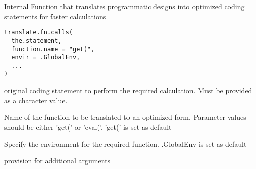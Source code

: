 \documentclass[a4paper]{book}
\begin{document}
%
\begin{Description}\relax
Internal Function that translates programmatic designs into optimized coding statements for faster calculations
\end{Description}
%
\begin{Usage}
\begin{verbatim}
translate.fn.calls(
  the.statement,
  function.name = "get(",
  envir = .GlobalEnv,
  ...
)
\end{verbatim}
\end{Usage}
%
\begin{Arguments}
\begin{ldescription}
\item[\code{the.statement}] original coding statement to perform the required calculation. Must be provided as a character value.

\item[\code{function.name}] Name of the function to be translated to an optimized form. Parameter values should be either 'get(' or 'eval('. 'get(' is set as default

\item[\code{envir}] Specify the environment for the required function. .GlobalEnv is set as default

\item[\code{...}] provision for additional arguments
\end{ldescription}
\end{Arguments}
\printindex{}
\end{document}
